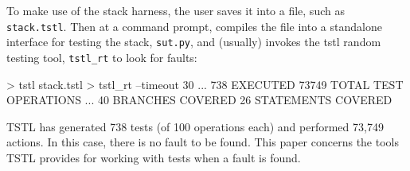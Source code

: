 To make use of the stack harness, the user saves it into a file, such
as {\tt stack.tstl}.  Then at a command prompt, compiles the file into
a standalone interface for testing the stack, {\tt sut.py}, and
(usually) invokes the tstl random testing tool, {\tt tstl\_rt} to look for faults:

{\scriptsize
\begin{code}
 > tstl stack.tstl
 > tstl\_rt --timeout 30
...
 738 EXECUTED
 73749 TOTAL TEST OPERATIONS
...
 40 BRANCHES COVERED
 26 STATEMENTS COVERED
\end{code}
}

TSTL has generated 738 tests (of 100 operations each) and performed
73,749 actions.  In this case, there is no fault to be found.  This
paper concerns the tools TSTL provides for working with tests when a
fault is found.

